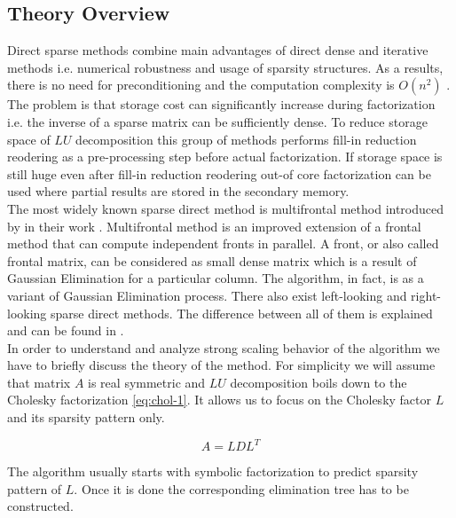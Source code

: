 \subsection{Theory Overview}
\label{subseq:direct-sparse methods}

Direct sparse methods combine main advantages of direct dense and iterative methods i.e. numerical robustness and usage of sparsity structures. As a results, there is no need for preconditioning and the computation complexity is $O(n^2)$ \cite{complexity-of-spdm}. The problem is that storage cost can significantly increase during factorization i.e. the inverse of a sparse matrix can be sufficiently dense. To reduce storage space of $LU$ decomposition this group of methods performs fill-in reduction reodering as a pre-processing step before actual factorization. If storage space is still huge even after fill-in reduction reodering out-of core factorization can be used where partial results are stored in the secondary memory. \\

The most widely known sparse direct method is multifrontal method introduced by \citeauthor{mult-frontal-original:1} in their work \cite{mult-frontal-original:1}. Multifrontal method is an improved extension of a frontal method \cite{frontal-original} that can compute independent fronts in parallel. A front, or also called frontal matrix, can be considered as small dense matrix which is a result of Gaussian Elimination for a particular column. The algorithm, in fact, is as a variant of Gaussian Elimination process. There also exist left-looking and right-looking sparse direct methods. The difference between all of them is explained and can be found in \cite{elimination-tree}.\\


In order to understand and analyze strong scaling behavior of the algorithm we have to briefly discuss the theory of the method. For simplicity we will assume that matrix $A$ is real symmetric and $LU$ decomposition boils down to the Cholesky factorization \ref{eq:chol-1}. It allows us to focus on the Cholesky factor $L$ and its sparsity pattern only.

\begin{equation} \label{eq:chol-1}
	A = LDL^T
\end{equation}

The algorithm usually starts with symbolic factorization to predict sparsity pattern of $L$. Once it is done the corresponding elimination tree has to be constructed.\\

